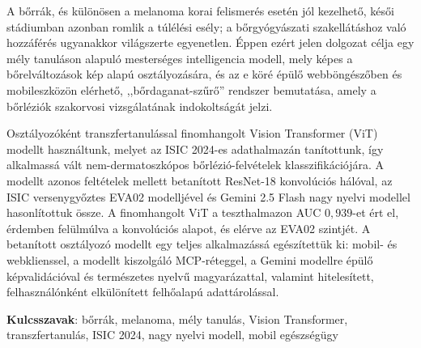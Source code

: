 A bőrrák, és különösen a melanoma korai felismerés esetén jól kezelhető, késői
stádiumban azonban romlik a túlélési esély; a bőrgyógyászati
szakellátáshoz való hozzáférés ugyanakkor világszerte egyenetlen.
Éppen ezért jelen dolgozat célja egy mély tanuláson alapuló mesterséges intelligencia modell,
mely képes a bőrelváltozások kép alapú osztályozására, és az e köré épülő webböngészőben és
mobileszközön elérhető, ,,bőrdaganat-szűrő'' rendszer bemutatása, amely a bőrléziók szakorvosi
vizsgálatának indokoltságát jelzi.

Osztályozóként transzfertanulással finomhangolt Vision Transformer (ViT) modellt
használtunk, melyet az ISIC 2024-es adathalmazán tanítottunk, így alkalmassá vált
nem-dermatoszkópos bőrlézió-felvételek klasszifikációjára. A modellt azonos feltételek
mellett betanított ResNet-18 konvolúciós hálóval, az ISIC versenygyőztes EVA02 modelljével
és Gemini 2.5 Flash nagy nyelvi modellel hasonlítottuk össze. 
A finomhangolt ViT a teszthalmazon AUC $0{,}939$-et ért el, érdemben felülmúlva
a konvolúciós alapot, és elérve az EVA02 szintjét.
A betanított osztályozó modellt egy teljes alkalmazássá egészítettük ki: mobil- és webklienssel, a
modellt kiszolgáló MCP-réteggel, a Gemini modellre épülő képvalidációval és
természetes nyelvű magyarázattal, valamint hitelesített, felhasználónként
elkülönített felhőalapú adattárolással.

\textbf{Kulcsszavak}: bőrrák, melanoma, mély tanulás, Vision Transformer,
transzfertanulás, ISIC 2024, nagy nyelvi modell, mobil
egészségügy
